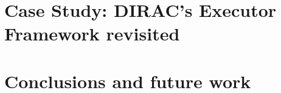 \documentclass[letter]{llncs}
\begin{document}
% 


\section{Case Study: DIRAC's Executor Framework revisited}
\label{sec:CaseStudy}
\section{Conclusions and future work}
\label{sec:Conclusions}

 

\end{document}
